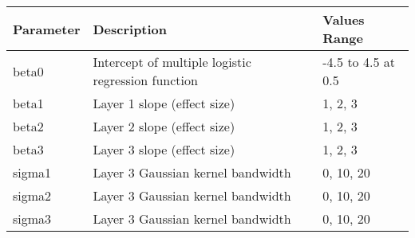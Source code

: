 \begingroup\fontsize{11pt}{12pt}\selectfont
\begin{tabularx}{\textwidth}{L{.5}L{1.75}L{.75}}
  \toprule
{\textbf{Parameter}} & {\textbf{Description}} & {\textbf{Values Range}} \\ 
  \midrule
beta0 & Intercept of multiple logistic regression function & -4.5 to 4.5 at 0.5 \\ 
  beta1 & Layer 1 slope (effect size) & 1, 2, 3 \\ 
  beta2 & Layer 2 slope (effect size) & 1, 2, 3 \\ 
  beta3 & Layer 3 slope (effect size) & 1, 2, 3 \\ 
  sigma1 & Layer 3 Gaussian kernel bandwidth & 0, 10, 20 \\ 
  sigma2 & Layer 3 Gaussian kernel bandwidth & 0, 10, 20 \\ 
  sigma3 & Layer 3 Gaussian kernel bandwidth & 0, 10, 20 \\ 
   \bottomrule
\end{tabularx}
\endgroup
